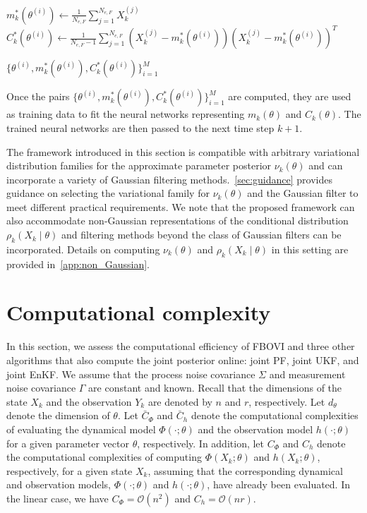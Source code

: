 \documentclass[preprint,3p,times]{elsarticle}
\begin{document}
\begin{algorithm}[t]
{    

    $m_k^*(\theta^{(i)}) \leftarrow \frac{1}{N_{e,F}}\sum_{j=1}^{N_{e,F}} X_k^{(j)}$ \\
    $C_k^*(\theta^{(i)}) \leftarrow \frac{1}{N_{e,F}-1} \sum_{j=1}^{N_{e,F}} (X_k^{(j)} - m_k^*(\theta^{(i)})) (X_k^{(j)} - m_k^*(\theta^{(i)}))^T$
    
}

\Return $\{ \theta^{(i)}, m_k^*(\theta^{(i)}), C_k^*(\theta^{(i)}) \}_{i=1}^{M}$
\end{algorithm}

Once the pairs \( \{ \theta^{(i)}, m_k^*(\theta^{(i)}), C_k^*(\theta^{(i)}) \}_{i=1}^{M} \) are computed, they are used as training data to fit the neural networks representing \( m_k(\theta) \) and \( C_k(\theta) \). The trained neural networks are then passed to the next time step \( k+1 \). 

The framework introduced in this section is compatible with arbitrary variational distribution families for the approximate parameter posterior $\nu_k(\theta)$ and can incorporate a variety of Gaussian filtering methods.~\ref{sec:guidance} provides guidance on selecting the variational family for $\nu_k(\theta)$ and the Gaussian filter to meet different practical requirements. We note that the proposed framework can also accommodate non-Gaussian representations of the conditional distribution $\rho_k(X_k \mid \theta)$ and filtering methods beyond the class of Gaussian filters can be incorporated. Details on computing $\nu_k(\theta)$ and $\rho_k(X_k \mid \theta)$ in this setting are provided in~\ref{app:non_Gaussian}.


\section{Computational complexity}
\label{sec:computational_complexity}
In this section, we assess the computational efficiency of FBOVI and three other algorithms that also compute the joint posterior online: joint PF, joint UKF, and joint EnKF. We assume that the process noise covariance $\Sigma$ and measurement noise covariance $\Gamma$ are constant and known. Recall that the dimensions of the state $X_k$ and the observation $Y_k$ are denoted by $n$ and $r$, respectively. Let $d_{\theta}$ denote the dimension of $\theta$. Let $\bar{C}_{\Phi}$ and $\bar{C}_h$ denote the computational complexities of evaluating the dynamical model $\Phi(\cdot;\theta)$ and the observation model $h(\cdot;\theta)$ for a given parameter vector $\theta$, respectively. In addition, let $C_{\Phi}$ and $C_h$ denote the computational complexities of computing $\Phi(X_k;\theta)$ and $h(X_k;\theta)$, respectively, for a given state $X_k$, assuming that the corresponding dynamical and observation models, $\Phi(\cdot;\theta)$ and $h(\cdot;\theta)$, have already been evaluated. In the linear case, we have $C_{\Phi}=\mathcal{O}(n^2)$ and $C_h=\mathcal{O}(nr)$.
\end{document}
